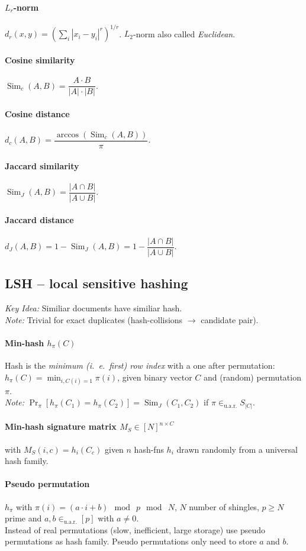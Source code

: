 \documentclass[a4paper, 9pt, DIV=24]{scrartcl}
\DeclareMathOperator{\Sim}{Sim}
\newcommand{\inuar}{\in_{\text{u.a.r.}}}
\begin{document}
\begin{twocolumn}
\paragraph{$L_r$-norm}
$d_r(x,y) = (\sum_i |x_i - y_i|^r)^{1/r}$. $L_2$-norm also called \emph{Euclidean}.
\paragraph{Cosine similarity} $\Sim_c(A,B) = \dfrac{A \cdot B}{|A|\cdot|B|}.$ 
\paragraph{Cosine distance} $d_c(A,B) = \dfrac{\arccos(\Sim_c(A,B))}{\pi}.$
\paragraph{Jaccard similarity} $\Sim_J(A,B) = \dfrac{|A \cap B|}{|A \cup B|}.$ 
\paragraph{Jaccard distance}
$ d_J(A,B) = 1 - \Sim_J(A,B) = 1 - \dfrac{|A \cap B|}{|A \cup B|}.$

\subsection{LSH -- local sensitive hashing}
\emph{Key Idea:} Similiar documents have similiar hash. \\
\emph{Note:} Trivial for exact duplicates (hash-collisions $\rightarrow$ candidate pair).
\paragraph{Min-hash $h_\pi(C)$}
Hash is the \emph{minimum (i.\ e.\ first) row index} with a one after permutation: $h_\pi(C) = \min_{i, C(i) = 1} \pi(i)$,
given binary vector $C$ and (random) permutation $\pi$. \\
\emph{Note:} $\Pr_\pi[h_\pi(C_1) = h_\pi(C_2)] = \Sim_J(C_1,C_2)$ if $\pi \inuar S_{|C|}$.
\paragraph{Min-hash signature matrix $M_S \in [N]^{n\times C}$}
with $M_S(i,c) = h_i(C_c)$
given $n$ hash-fns $h_i$ drawn randomly from a universal hash family.

\paragraph{Pseudo permutation}
$h_\pi$ with $\pi(i) = (a\cdot i + b) \mod\ p \mod\ N$, $N$ number of shingles, $p\geq N$ prime and $a,b \inuar [p]$ with $a \neq 0$. \\
Instead of real permutations (slow, inefficient, large storage) use pseudo permutations as hash family. Pseudo permutations only need to store $a$ and $b$.


\end{twocolumn}
\end{document}
